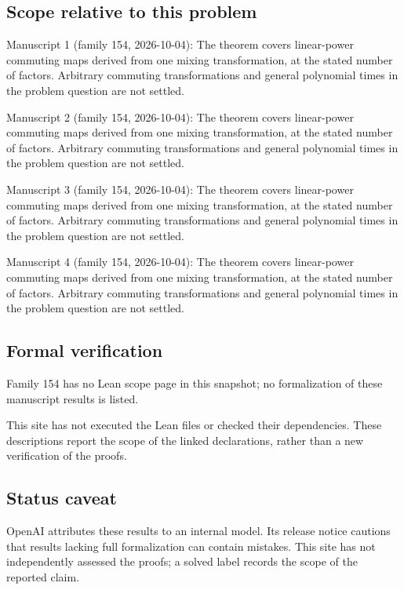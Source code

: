 \documentclass[11pt]{article}
\begin{document}
\subsection{Scope relative to this problem}
Manuscript 1 (family 154, 2026-10-04): The theorem covers linear-power commuting maps derived from one mixing transformation, at the stated number of factors. Arbitrary commuting transformations and general polynomial times in the problem question are not settled.

Manuscript 2 (family 154, 2026-10-04): The theorem covers linear-power commuting maps derived from one mixing transformation, at the stated number of factors. Arbitrary commuting transformations and general polynomial times in the problem question are not settled.

Manuscript 3 (family 154, 2026-10-04): The theorem covers linear-power commuting maps derived from one mixing transformation, at the stated number of factors. Arbitrary commuting transformations and general polynomial times in the problem question are not settled.

Manuscript 4 (family 154, 2026-10-04): The theorem covers linear-power commuting maps derived from one mixing transformation, at the stated number of factors. Arbitrary commuting transformations and general polynomial times in the problem question are not settled.

\subsection{Formal verification}
Family 154 has no Lean scope page in this snapshot; no formalization of these manuscript results is listed.

This site has not executed the Lean files or checked their dependencies. These descriptions report the scope of the linked declarations, rather than a new verification of the proofs.

\subsection{Status caveat}
OpenAI attributes these results to an internal model. Its release notice cautions that results lacking full formalization can contain mistakes. This site has not independently assessed the proofs; a solved label records the scope of the reported claim.
\end{document}
